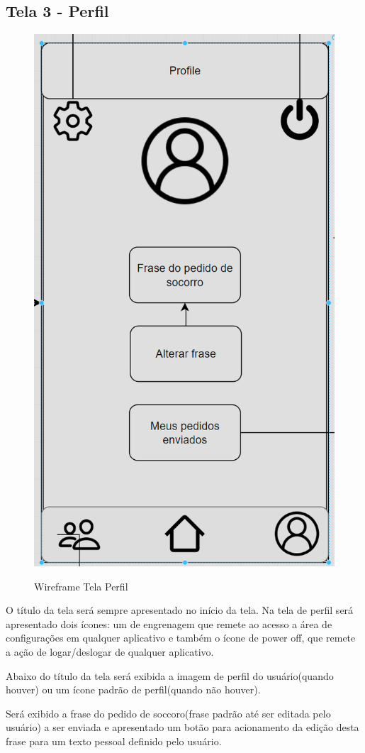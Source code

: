 \subsection{Tela 3 - Perfil}
\begin{figure}[H]
  \begin{center}
  \includegraphics[width=0.2\linewidth]{images/wire-tela-perfil.png}\\
  \end{center}
  \caption[Wireframe Tela Perfil]{Wireframe Tela Perfil}
  \label{fig:wireframe-tela-perfil}
\end{figure}
O título da tela será sempre apresentado no início da tela.  Na tela de perfil será apresentado dois ícones: um de engrenagem que remete ao acesso a área de configurações em qualquer aplicativo e também o ícone de power off, que remete a ação de logar/deslogar de qualquer aplicativo. 

Abaixo do título da tela será exibida a imagem de perfil do usuário(quando houver) ou um ícone padrão de perfil(quando não houver).

Será exibido a frase do pedido de soccoro(frase padrão até ser editada pelo usuário) a ser enviada e apresentado um botão para acionamento da edição desta frase para um texto pessoal definido pelo usuário. 

